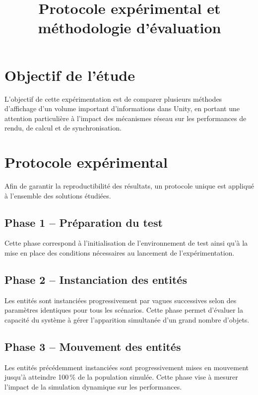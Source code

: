 \documentclass[11pt,a4paper]{article}
\title{Protocole expérimental et méthodologie d'évaluation}
\author{}
\date{}
\begin{document}
\maketitle

\section{Objectif de l'étude}

L'objectif de cette expérimentation est de comparer plusieurs méthodes d'affichage d'un volume important d'informations dans Unity, en portant une attention particulière à l'impact des mécanismes réseau sur les performances de rendu, de calcul et de synchronisation.

\section{Protocole expérimental}

Afin de garantir la reproductibilité des résultats, un protocole unique est appliqué à l'ensemble des solutions étudiées.

\subsection{Phase 1 -- Préparation du test}

Cette phase correspond à l'initialisation de l'environnement de test ainsi qu'à la mise en place des conditions nécessaires au lancement de l'expérimentation.

\subsection{Phase 2 -- Instanciation des entités}

Les entités sont instanciées progressivement par vagues successives selon des paramètres identiques pour tous les scénarios. Cette phase permet d'évaluer la capacité du système à gérer l'apparition simultanée d'un grand nombre d'objets.

\subsection{Phase 3 -- Mouvement des entités}

Les entités précédemment instanciées sont progressivement mises en mouvement jusqu'à atteindre 100\,\% de la population simulée. Cette phase vise à mesurer l'impact de la simulation dynamique sur les performances.
\end{document}
